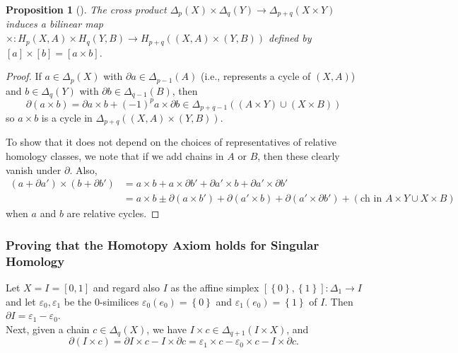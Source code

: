 \documentclass[reqno]{amsart}
\newtheorem{proposition}[theorem]{Proposition}
\theoremstyle{definition}
\theoremstyle{remark}
\begin{document}
\begin{proposition}[]
    The cross product 
    $\Delta_p(X) \times \Delta_q (Y) \to 
    \Delta_{p+q}(X \times Y)$ induces a bilinear
    map $\times  \colon H_p (X,A) \times 
    H_q (Y,B) \to H_{p+q} \left( (X ,A) \times (Y,B) \right) $ 
    defined by $\left[ a \right] \times 
    \left[ b \right] = \left[ a \times b \right] $.
\end{proposition}

\begin{proof}
    If $a \in \Delta_p (X)$ with
    $\partial a \in \Delta_{p-1}(A)$ (i.e., represents
     a cycle of $(X,A)$) and
     $b \in \Delta_q(Y)$ with $\partial b \in \Delta_{q-1}(B)$, then
     \[
     \partial \left( a\times b \right) 
     = \partial a \times b + (-1)^{p} a \times \partial b
     \in \Delta_{p+q-1}\left( (A \times Y) \cup 
     (X \times B) \right) 
     \] 
     so
     $a \times b$ is a cycle in
     $\Delta_{p+q} \left( (X,A) \times (Y,B) \right) $.

     To show that it does not depend on the
     choices of representatives of relative homology classes,
     we note that if we add chains in $A$ or $B$, then
     these clearly vanish under $\partial$. Also,
     \begin{align*}
         (a+ \partial a') \times 
         (b + \partial b')
         &= a \times b + a \times \partial b' +
         \partial a' \times b + \partial a' \times \partial b'\\
         &= a \times b \pm \partial (a \times b')
         + \partial (a' \times b) +
         \partial (a' \times \partial b')
         + \left( \text{ch in } A \times Y \cup 
         X \times B\right)
     \end{align*}
     when $a$ and $b$ are relative cycles.
\end{proof}

\subsubsection{Proving that the Homotopy Axiom holds
for Singular Homology}

Let $X = I = \left[ 0,1 \right] $ and regard
also $I$ as the affine simplex
$\left[ \left\{ 0 \right\} ,\left\{ 1 \right\}  \right] 
\colon \Delta_1 \to I$ and let
$\varepsilon_0, \varepsilon_1$ be the $0$-similices
$\varepsilon_0 (e_0) = \left\{ 0 \right\} $ and
$\varepsilon_1 (e_0) = \left\{ 1 \right\} $ of $I$.
Then $\partial I = \varepsilon_1 - \varepsilon_0$.\\
\linebreak
Next, given a chain
$c \in \Delta_q (X)$, we have
$I \times c \in \Delta_{q+1}(I \times X)$, and
\[
\partial \left( I \times c \right) =
\partial I \times c - I \times \partial c
= \varepsilon_1 \times c - \varepsilon_0 \times c
- I \times \partial c.
\] 
\end{document}
